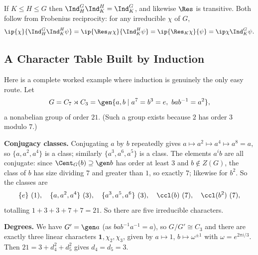 \begin{remark}
	If $K\leq H\leq G$ then $\Ind_H^G\Ind_K^H = \Ind_K^G$, and likewise $\Res$ is transitive. Both follow from Frobenius reciprocity: for any irreducible $\chi$ of $G$,
	$$\ip{\chi}{\Ind_H^G\Ind_K^H\psi} = \ip{\Res_H\chi}{\Ind_K^H\psi} = \ip{\Res_K\chi}{\psi} = \ip\chi{\Ind_K^G\psi}.$$
\end{remark}

\subsection{A Character Table Built by Induction}

Here is a complete worked example where induction is genuinely the only easy route. Let
$$G = C_7\rtimes C_3 = \gen{a, b \mid a^7 = b^3 = e,\ bab^{-1} = a^2},$$
a nonabelian group of order $21$. (Such a group exists because $2$ has order $3$ modulo $7$.)

\textbf{Conjugacy classes.} Conjugating $a$ by $b$ repeatedly gives $a\mapsto a^2\mapsto a^4\mapsto a^8 = a$, so $\{a,a^2,a^4\}$ is a class; similarly $\{a^3,a^6,a^5\}$ is a class. The elements $a^ib$ are all conjugate: since $\Cent_G(b)\supseteq\gen b$ has order at least $3$ and $b\notin Z(G)$, the class of $b$ has size dividing $7$ and greater than $1$, so exactly $7$; likewise for $b^2$. So the classes are
$$\{e\}\ (1),\quad \{a,a^2,a^4\}\ (3),\quad\{a^3,a^5,a^6\}\ (3),\quad \ccl(b)\ (7),\quad\ccl(b^2)\ (7),$$
totalling $1+3+3+7+7 = 21$. So there are five irreducible characters.

\textbf{Degrees.} We have $G' = \gen a$ (as $bab^{-1}a^{-1} = a$), so $G/G'\cong C_3$ and there are exactly three linear characters $\mathbf 1,\chi_2,\chi_3$, given by $a\mapsto1$, $b\mapsto\omega^{\pm1}$ with $\omega = e^{2\pi i/3}$. Then $21 = 3 + d_4^2+d_5^2$ gives $d_4 = d_5 = 3$.

